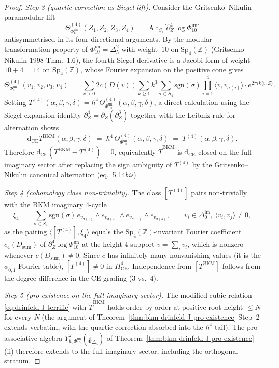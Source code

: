 \begin{proof}
\emph{Step 3 (quartic correction as Siegel lift).}
Consider the Gritsenko--Nikulin paramodular lift
\[
 \Theta^{(4)}_{\Phi_{10}^{\mathrm{un}}}(Z_1,Z_2,Z_3,Z_4)
 \;=\;\mathrm{Alt}_{S_4}\bigl[\partial^4_Z\log\Phi_{10}^{\mathrm{un}}\bigr]
\]
antisymmetrised in its four directional arguments. By the modular
transformation property of \(\Phi_{10}^{\mathrm{un}}=\Delta_5^2\) with
weight~$10$ on \(\mathrm{Sp}_4(\mathbb Z)\) (Gritsenko--Nikulin 1998
Thm.~1.6), the fourth Siegel derivative is a Jacobi form of weight \(10+4=14\) on
$\mathrm{Sp}_4(\mathbb Z)$, whose Fourier expansion on the positive cone
gives
\[
 \Theta^{(4)}_{\Phi_{10}^{\mathrm{un}}}(v_1,v_2,v_3,v_4)
 \;=\;\sum_{v>0} 2c(D(v))\sum_{k\ge 1}k^3
 \sum_{\sigma\in S_4}\mathrm{sgn}(\sigma)
 \prod_{i=1}^{4}\langle v,v_{\sigma(i)}\rangle\cdot
 e^{2\pi i k\langle v,Z\rangle}.
\]
Setting $T^{(4)}(\alpha,\beta,\gamma,\delta)
=\hbar^4\,\Theta^{(4)}_{\Phi_{10}^{\mathrm{un}}}(\alpha,\beta,\gamma,\delta)$, a
direct calculation using the Siegel-expansion identity
$\partial^4_Z = \partial_Z(\partial^3_Z)$ together with the Leibniz
rule for alternation shows
\[
 \mathrm d_{\mathrm{CE}}T^{\mathrm{BKM}}(\alpha,\beta,\gamma,\delta)
 \;=\;\hbar^4\,\Theta^{(4)}_{\Phi_{10}^{\mathrm{un}}}(\alpha,\beta,\gamma,\delta)
 \;=\; T^{(4)}(\alpha,\beta,\gamma,\delta).
\]
Therefore
$\mathrm d_{\mathrm{CE}}(T^{\mathrm{BKM}}-T^{(4)}) = 0$,
equivalently $\widetilde T^{\mathrm{BKM}}$ is
$\mathrm d_{\mathrm{CE}}$-closed on the full imaginary sector after
replacing the sign ambiguity of $T^{(4)}$ by the Gritsenko--Nikulin
canonical alternation (eq.~5.14\textit{bis}).

\emph{Step 4 (cohomology class non-triviality).}
The class $[T^{(4)}]$ pairs non-trivially with the BKM imaginary
$4$-cycle
\[
 \xi_4 \;=\; \sum_{\sigma\in S_4}\mathrm{sgn}(\sigma)\,
 e_{v_{\sigma(1)}}\wedge e_{v_{\sigma(2)}}\wedge e_{v_{\sigma(3)}}\wedge e_{v_{\sigma(4)}},
 \qquad v_i\in\Delta^{\mathrm{im}}_0,\ \langle v_i,v_j\rangle\ne 0,
\]
as the pairing $\langle [T^{(4)}],\xi_4\rangle$ equals the
$\mathrm{Sp}_4(\mathbb Z)$-invariant Fourier coefficient
$c_4(D_{\mathrm{sum}})$ of \(\partial^4_Z\log\Phi_{10}^{\mathrm{un}}\) at the
height-$4$ support $v=\sum_i v_i$, which is nonzero whenever
$c(D_{\mathrm{sum}})\ne 0$. Since $c$ has infinitely many nonvanishing
values (it is the $\phi_{0,1}$ Fourier table), $[T^{(4)}]\ne 0$ in
$H^4_{\mathrm{CE}}$. Independence from $[T^{\mathrm{BKM}}]$ follows from
the degree difference in the CE-grading ($3$ vs.\ $4$).

\emph{Step 5 (pro-existence on the full imaginary sector).}
The modified cubic relation \eqref{eq:drinfeld-J-terrific} with
$\widetilde T^{\mathrm{BKM}}$ holds order-by-order at positive-root
height $\le N$ for every $N$ (the argument of
Theorem~\ref{thm:bkm-drinfeld-J-pro-existence} Step~2 extends
verbatim, with the quartic correction absorbed into the $\hbar^4$
tail). The pro-associative algebra
\(Y^J_{\hbar,\Phi_{10}^{\mathrm{un}}}(\mathfrak g_{\Delta_5})\) of
Theorem~\ref{thm:bkm-drinfeld-J-pro-existence}(ii) therefore extends
to the full imaginary sector, including the orthogonal stratum.
\end{proof}

